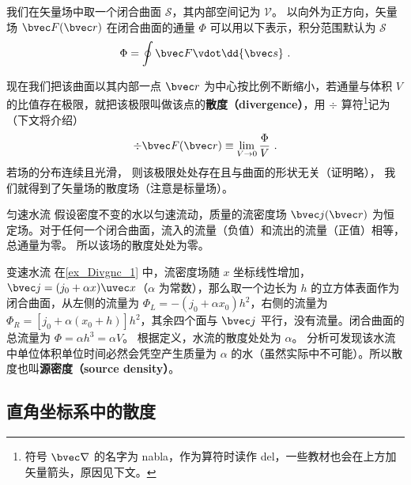

我们在矢量场中取一个闭合曲面 $\mathcal{S}$，其内部空间记为 $\mathcal{V}$。 以向外为正方向，矢量场 $\bvec F(\bvec r)$ 在闭合曲面的通量 $\Phi$ 可以用以下表示，积分范围默认为 $\mathcal{S}$
\begin{equation}\label{eq_Divgnc_1}
\Phi  = \oint \bvec F \vdot \dd{\bvec s}~.
\end{equation}

现在我们把该曲面以其内部一点 $\bvec r$ 为中心按比例不断缩小，若通量与体积 $V$ 的比值存在极限，就把该极限叫做该点的\textbf{散度（divergence）}，用 $\div$ 算符\footnote{符号 $\bvec\nabla$ 的名字为 nabla，作为算符时读作 del，一些教材也会在上方加矢量箭头，原因见下文。}记为（下文将介绍）
\begin{equation}\label{eq_Divgnc_2}
\div \bvec F(\bvec r) \equiv \lim_{V \to 0} \frac{\Phi }{V}~.
\end{equation}
若场的分布连续且光滑， 则该极限处处存在且与曲面的形状无关（证明略）， 我们就得到了矢量场的散度场（注意是标量场）。

\begin{example}{匀速水流}\label{ex_Divgnc_1}
假设密度不变的水以匀速流动，质量的流密度场 $\bvec j(\bvec r)$ 为恒定场。对于任何一个闭合曲面，流入的流量（负值）和流出的流量（正值）相等，总通量为零。 所以该场的散度处处为零。
\end{example}

\begin{example}{变速水流}
在\autoref{ex_Divgnc_1} 中，流密度场随 $x$ 坐标线性增加， $\bvec j = (j_0 + \alpha x)\uvec x$（$\alpha$ 为常数），那么取一个边长为 $h$ 的立方体表面作为闭合曲面，从左侧的流量为 $\Phi_L =  - (j_0 + \alpha x_0) h^2$，右侧的流量为 $\Phi_R = [j_0 + \alpha (x_0 + h)] h^2$，其余四个面与 $\bvec j$ 平行，没有流量。闭合曲面的总流量为 $\Phi  = \alpha h^3 = \alpha V$。 根据定义，水流的散度处处为 $\alpha$。 分析可发现该水流中单位体积单位时间必然会凭空产生质量为 $\alpha$ 的水（虽然实际中不可能）。所以散度也叫\textbf{源密度（source density）}。
\end{example}

\subsection{直角坐标系中的散度}

